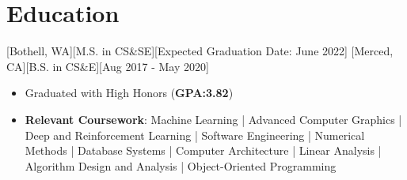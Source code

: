 \documentclass{article}
\begin{document}
%
%
%


\section{Education}
[Bothell, WA][M.S. in CS\&SE][Expected Graduation Date: June 2022]
[Merced, CA][B.S. in CS\&E][Aug 2017 - May 2020]
\begin{itemize}
  \item Graduated with High Honors (\textbf{GPA:3.82})
  \item \textbf{Relevant Coursework}: Machine Learning | Advanced Computer Graphics | Deep and Reinforcement Learning | Software Engineering | Numerical Methods | Database Systems | Computer Architecture | Linear Analysis | Algorithm Design and Analysis | Object-Oriented Programming
\end{itemize}
\end{document}
